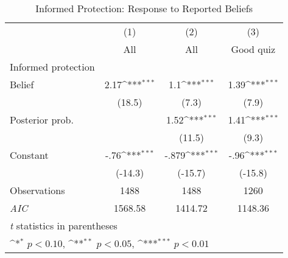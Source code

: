 \begin{table}[htbp]\centering
\def\sym#1{\ifmmode^{#1}\else\(^{#1}\)\fi}
\caption{Informed Protection: Response to Reported Beliefs}
\begin{tabular}{l*{3}{c}}
\hline\hline
                &\multicolumn{1}{c}{(1)}&\multicolumn{1}{c}{(2)}&\multicolumn{1}{c}{(3)}\\
                &\multicolumn{1}{c}{All}&\multicolumn{1}{c}{All}&\multicolumn{1}{c}{Good quiz}\\
\hline
Informed protection&                  &                  &                  \\
Belief          &     2.17\sym{***}&      1.1\sym{***}&     1.39\sym{***}\\
                &   (18.5)         &    (7.3)         &    (7.9)         \\
Posterior prob. &                  &     1.52\sym{***}&     1.41\sym{***}\\
                &                  &   (11.5)         &    (9.3)         \\
Constant        &     -.76\sym{***}&    -.879\sym{***}&     -.96\sym{***}\\
                &  (-14.3)         &  (-15.7)         &  (-15.8)         \\
\hline
Observations    &     1488         &     1488         &     1260         \\
\textit{AIC}    &  1568.58         &  1414.72         &  1148.36         \\
\hline\hline
\multicolumn{4}{l}{\footnotesize \textit{t} statistics in parentheses}\\
\multicolumn{4}{l}{\footnotesize \sym{*} \(p<0.10\), \sym{**} \(p<0.05\), \sym{***} \(p<0.01\)}\\
\end{tabular}
\end{table}
